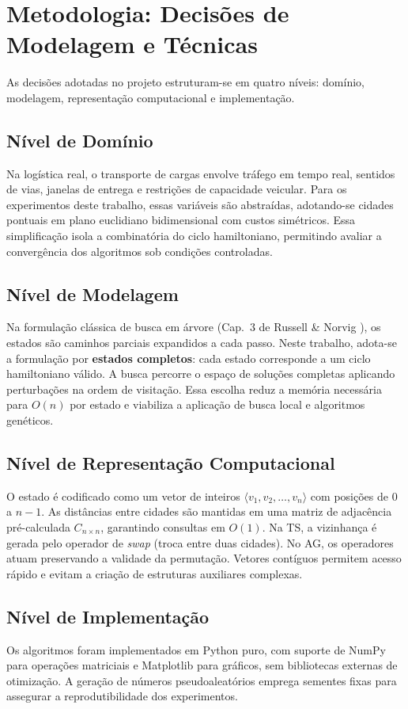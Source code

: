 \documentclass[11pt]{article}
\begin{document}
\section{Metodologia: Decisões de Modelagem e Técnicas}

As decisões adotadas no projeto estruturam-se em quatro níveis: domínio, modelagem, representação computacional e implementação.

\subsection{Nível de Domínio}
Na logística real, o transporte de cargas envolve tráfego em tempo real, sentidos de vias, janelas de entrega e restrições de capacidade veicular. Para os experimentos deste trabalho, essas variáveis são abstraídas, adotando-se cidades pontuais em plano euclidiano bidimensional com custos simétricos. Essa simplificação isola a combinatória do ciclo hamiltoniano, permitindo avaliar a convergência dos algoritmos sob condições controladas.

\subsection{Nível de Modelagem}
Na formulação clássica de busca em árvore (Cap.~3 de Russell \& Norvig \cite{russell2022ia}), os estados são caminhos parciais expandidos a cada passo. Neste trabalho, adota-se a formulação por \textbf{estados completos}: cada estado corresponde a um ciclo hamiltoniano válido. A busca percorre o espaço de soluções completas aplicando perturbações na ordem de visitação. Essa escolha reduz a memória necessária para $O(n)$ por estado e viabiliza a aplicação de busca local e algoritmos genéticos.

\subsection{Nível de Representação Computacional}
O estado é codificado como um vetor de inteiros $\langle v_1, v_2, \dots, v_n \rangle$ com posições de $0$ a $n-1$. As distâncias entre cidades são mantidas em uma matriz de adjacência pré-calculada $C_{n \times n}$, garantindo consultas em $O(1)$. Na TS, a vizinhança é gerada pelo operador de \textit{swap} (troca entre duas cidades). No AG, os operadores atuam preservando a validade da permutação. Vetores contíguos permitem acesso rápido e evitam a criação de estruturas auxiliares complexas.

\subsection{Nível de Implementação}
Os algoritmos foram implementados em Python puro, com suporte de NumPy para operações matriciais e Matplotlib para gráficos, sem bibliotecas externas de otimização. A geração de números pseudoaleatórios emprega sementes fixas para assegurar a reprodutibilidade dos experimentos.
\end{document}
